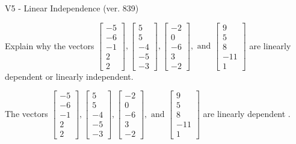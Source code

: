 \begin{exercise}
  \begin{exerciseTitle}V5 - Linear Independence (ver. 839)\end{exerciseTitle}
  \begin{exerciseStatement}
    Explain why the vectors \(\left[\begin{array}{r}
-5 \\
-6 \\
-1 \\
2 \\
2
\end{array}\right] , \left[\begin{array}{r}
5 \\
5 \\
-4 \\
-5 \\
-3
\end{array}\right] , \left[\begin{array}{r}
-2 \\
0 \\
-6 \\
3 \\
-2
\end{array}\right] , \text{ and } \left[\begin{array}{r}
9 \\
5 \\
8 \\
-11 \\
1
\end{array}\right]\) are linearly dependent or linearly independent.	


  \end{exerciseStatement}
  \begin{exerciseAnswer}
   The vectors \(\left[\begin{array}{r}
-5 \\
-6 \\
-1 \\
2 \\
2
\end{array}\right] , \left[\begin{array}{r}
5 \\
5 \\
-4 \\
-5 \\
-3
\end{array}\right] , \left[\begin{array}{r}
-2 \\
0 \\
-6 \\
3 \\
-2
\end{array}\right] , \text{ and } \left[\begin{array}{r}
9 \\
5 \\
8 \\
-11 \\
1
\end{array}\right]\) are 
  	 linearly dependent  .
  


  \end{exerciseAnswer}
\end{exercise}